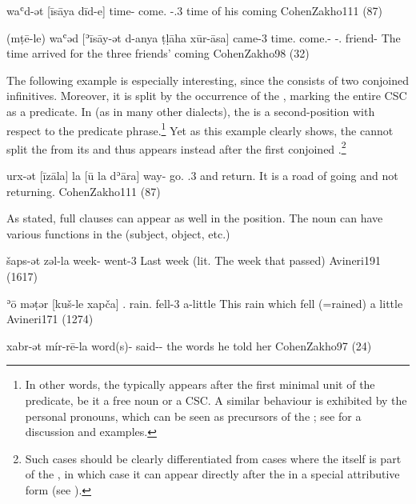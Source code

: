 {waʿd-ət [īsāya dīd-e]}
{time-\cst{} come.\inf{} \lnk-\poss.3\masc}
{time of his coming}
{CohenZakho}{111 (87)}

{(mṭē-le) waʿəd [ʾīsāy-ət d-anya ṭḷāha xūr-āsa]}
{came-3\masc{} time.\cst{} come.\inf-\cst{} \gen-\dem.\pl{} friend-\pl}
{The time arrived for the three friends’ coming}
{CohenZakho}{98 (32)}

The following example is especially interesting, since the \secn consists of two conjoined infinitives. Moreover, it is split by the occurrence of the  , marking the entire CSC as a predicate. In \JZax (as in many other  dialects), the  is a second-position  with respect to the predicate phrase.\footnote{In other words, the  typically appears after the first minimal unit of the predicate, be it a free noun or a CSC.
A similar behaviour is exhibited by the \Syr {} personal pronouns, which can be seen as precursors of the ; see \citet[121ff.]{GutmanVanPeursen} for a discussion and examples.} Yet  as this example clearly shows, the  cannot split the \cst* \prim from its \secn and thus appears instead after the first conjoined \secn.\footnote{Such cases should be clearly differentiated from cases where the  itself is part of the \secn, in which case it can appear directly after the \prim in a special attributive form (see ).}

{urx-ət [īzāla] \cb{}la [ū\cb{} la dʾāra]}
{way-\cst{} go.\inf{} \cb{}\cop.3\fem{} and\cb{} \neg{} return.\inf}
{It is a road of going and not returning.}
{CohenZakho}{111 (87)}\antipar

As stated, full clauses can appear as well in the \secn position. The \prim noun can have various functions in the  (subject, object, etc.)

{šaps-ət zəl-la}
{week-\cst{} went-3\fem}
{Last week (lit. The week that passed)}
{Avineri}{191 (1617)}

{ʾō məṭər [kuš-le xapča]}
{.\masc{} rain.\cst{} fell-3\masc{} a-little}
{This rain which fell (=rained) a little}
{Avineri}{171 (1274)}

{xabr-ət mír-rē-la}
{word(s)-\cst{} said-\masc-\fem}
{the words he told her}
{CohenZakho}{97 (24)}

